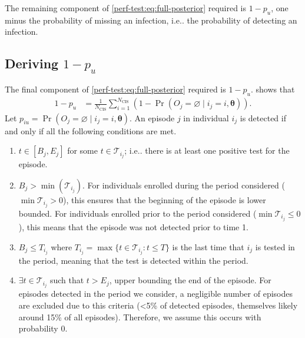 \documentclass[12pt]{article}
\makeatletter
\DeclareMathOperator{\prob}{\mathrm{Pr}}
\renewcommand{\vec}[1]{\bm{#1}}
\newcommand{\ssep}{:}
\newcommand{\Ncis}{N_\text{CIS}}
\newcommand{\sched}{\mathcal{T}}
\DeclareRobustCommand\onedot{\futurelet\@let@token\@onedot}
\def\@onedot{\ifx\@let@token.\else.\null\fi\xspace}
\def\ie{i.e\onedot} \def\Ie{{I.e}\onedot}
\makeatother
\begin{document}
The remaining component of \cref{perf-test:eq:full-posterior} required is $1- p_u$, one minus the probability of missing an infection, \ie the probability of detecting an infection.

\subsection{Deriving $1 - p_u$} \label{sec:prob-undetected}

The final component of \cref{perf-test:eq:full-posterior} required is $1 - p_u$.
 shows that
\begin{align}
  1 - p_u
  &= \frac{1}{\Ncis} \sum_{i=1}^{\Ncis} (1 - \prob(O_j = \varnothing \mid i_j = i, \vec{\theta})).
  \label{perf-test:eq:pu}
\end{align}
Let $p_{iu} = \prob(O_j = \varnothing \mid i_j = i, \vec{\theta})$.
An episode $j$ in individual $i_j$ is detected if and only if all the following conditions are met.
\begin{enumerate}
    \item 
    $t\in[B_j, E_j]$ for some $t \in \sched_{i_j}$;
    \ie there is at least one positive test for the episode.
    \item $B_j > \min ( \sched_{i_j} )$.
      For individuals enrolled during the period considered ($\min \sched_{i_j} > 0$), this ensures that the beginning of the episode is lower bounded.
      For individuals enrolled prior to the period considered ($\min \sched_{i_j} \leq 0$), this means that the episode was not detected prior to time 1.
    \item $B_j \leq T_{i_j}$ where $T_{i_j} = \max \{ t \in \sched_{i_j} \ssep t \leq T \}$ is the last time that $i_j$ is tested in the period, meaning that the test is detected within the period.
    \item $\exists t \in \sched_{i_j}$ such that $t > E_j$, upper bounding the end of the episode.
      For episodes detected in the period we consider, a negligible number of episodes are excluded due to this criteria (<5\% of detected episodes, themselves likely around 15\% of all episodes).
      Therefore, we assume this occurs with probability 0.
\end{enumerate}
\end{document}
